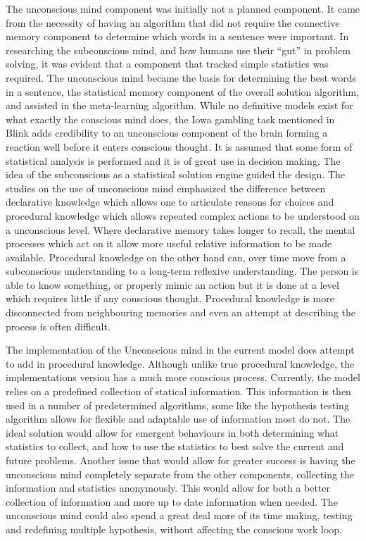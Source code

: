 The unconscious mind component was initially not a planned component.  It came
from the necessity of having an algorithm that did not require the connective
memory component to determine which words in a sentence were important. In
researching the subconscious mind, and how humans use their ``gut'' in problem
solving, it was evident that a component that tracked simple statistics was
required. The unconscious mind became the basis for determining the best words
in a sentence, the statistical memory component of the overall solution
algorithm, and assisted in the meta-learning algorithm.  While no definitive
models exist for what exactly the conscious mind does, the Iowa gambling task
\cite{Bechara1, Bechara2} mentioned in Blink \cite{BLINK} adds credibility to an
unconscious component of the brain forming a reaction well before it enters
conscious thought. It is assumed that some form of statistical analysis is
performed and it is of great use in decision making.  The idea of the
subconscious as a statistical solution engine guided the design.  The studies on
the use of unconscious mind emphasized the difference between declarative
knowledge which allows one to articulate reasons for choices and procedural
knowledge which allows repeated complex actions to be understood on a
unconscious level.  Where declarative memory takes longer to recall, the mental
processes which act on it allow more useful relative information to be made
available.  Procedural knowledge on the other hand can, over time move from a
subconscious understanding to a long-term reflexive understanding.  The person
is able to know something, or properly mimic an action but it is done at a level
which requires little if any conscious thought.  Procedural knowledge is more
disconnected from neighbouring memories and even an attempt at describing the
process is often difficult.

The implementation of the Unconscious mind in the current model does attempt to
add in procedural knowledge.  Although unlike true procedural knowledge, the
implementations version has a much more conscious process.  Currently, the model
relies on a predefined collection of statical information.  This information is
then used in a number of predetermined algorithms, some like the hypothesis
testing algorithm allows for flexible and adaptable use of information most do
not.  The ideal solution would allow for emergent behaviours in both determining
what statistics to collect, and how to use the statistics to best solve the
current and future problems.  Another issue that would allow for greater success
is having the unconscious mind completely separate from the other components,
collecting the information and statistics anonymously. This would allow for both
a better collection of information and more up to date information when needed.
The unconscious mind could also spend a great deal more of its time making,
testing and redefining multiple hypothesis, without affecting the conscious work
loop.

